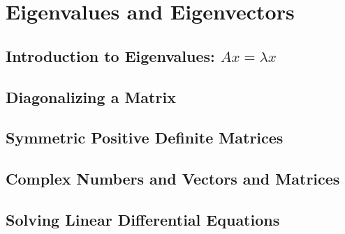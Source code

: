 \chapter{Eigenvalues and Eigenvectors}

\section{Introduction to Eigenvalues: \(Ax = \lambda x\) }

\section{Diagonalizing a Matrix}

\section{Symmetric Positive Definite Matrices}

\section{Complex Numbers and Vectors and Matrices}

\section{Solving Linear Differential Equations}
